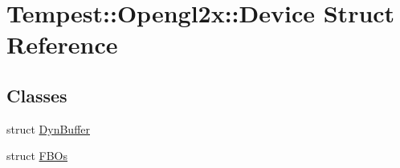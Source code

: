 \hypertarget{struct_tempest_1_1_opengl2x_1_1_device}{\section{Tempest\+:\+:Opengl2x\+:\+:Device Struct Reference}
\label{struct_tempest_1_1_opengl2x_1_1_device}
}
\subsection*{Classes}
\begin{DoxyCompactItemize}
\item 
struct \hyperlink{struct_tempest_1_1_opengl2x_1_1_device_1_1_dyn_buffer}{Dyn\+Buffer}
\item 
struct \hyperlink{struct_tempest_1_1_opengl2x_1_1_device_1_1_f_b_os}{F\+B\+Os}
\end{DoxyCompactItemize}

